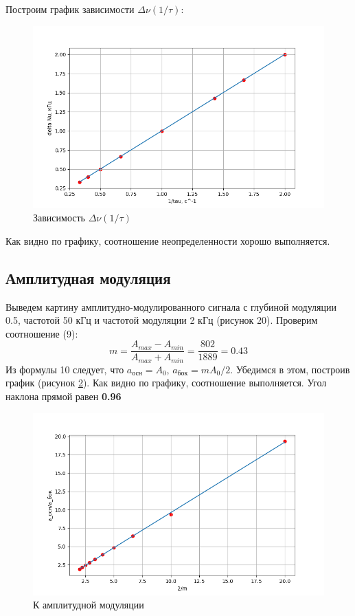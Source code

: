 \documentclass[a4paper, 12pt]{article}
\begin{document}
Построим график зависимости $\Delta \nu (1/\tau)$:
\begin{figure}[H]
    \centering
    \includegraphics[width=1\textwidth]{zugs_out.png}
    \caption{Зависимость $\Delta \nu (1/\tau)$}
    \label{fig:zugs_out.jpg}
\end{figure}
Как видно по графику, соотношение неопределенности хорошо выполняется.

\subsection{Амплитудная модуляция}

Выведем картину амплитудно-модулированного сигнала с глубиной модуляции 0.5, частотой 50 кГц и частотой модуляции 2 кГц (рисунок 20).
Проверим соотношение (9):
\begin{equation}
	m = \dfrac{A_{max}-A_{min}}{A_{max}+A_{min}} =  \dfrac{802}{1889} = 0.43
\end{equation}
Из формулы 10 следует, что $a_{\text{осн}} = A_0$, $a_{\text{бок}} = mA_0/2$.
Убедимся в этом, построив график (рисунок \ref{fig:am_out}). Как видно по графику, соотношение выполняется.
Угол наклона прямой равен \textbf{0.96}
\begin{figure}[H]
    \centering
    \includegraphics[width=1\textwidth]{am_out.png}
    \caption{К амплитудной модуляции}
    \label{fig:am_out}
\end{figure}
\end{document}
